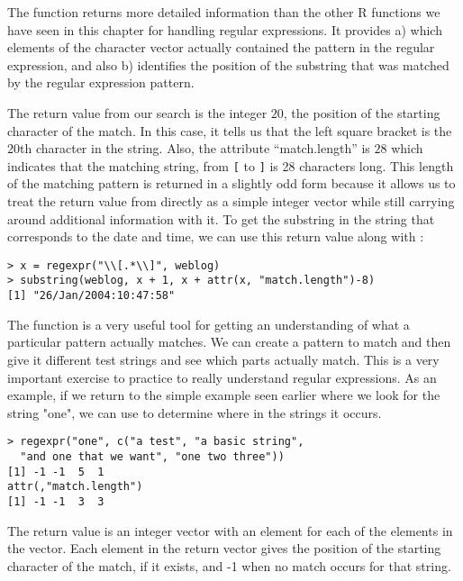The function  returns more detailed information
than the other R functions we have seen in this chapter for handling
regular expressions.  It provides a) which elements of the character
vector actually contained the pattern in the regular expression, and
also b) identifies the position of the substring that was matched by
the regular expression pattern.
 
The return value from our search is the integer $20$, the position of
the starting character of the match.  In this case, it tells us that
the left square bracket is the 20th character in the string. Also, the
attribute ``match.length'' is $28$ which indicates that the matching
string, from \verb+[+ to \verb+]+ is 28 characters long.  This length
of the matching pattern is returned in a slightly odd form because it
allows us to treat the return value from  directly
as a simple integer vector while still carrying around additional
information with it.  To get the substring in the string that
corresponds to the date and time, we can use this return value along
with : 
{\footnotesize{
\begin{verbatim}
> x = regexpr("\\[.*\\]", weblog)
> substring(weblog, x + 1, x + attr(x, "match.length")-8)
[1] "26/Jan/2004:10:47:58"
\end{verbatim}  
}}

The  function is a very useful tool for getting an
understanding of what a particular pattern actually matches.  We can
create a pattern to match and then give it different test strings and
see which parts actually match.  This is a very important exercise to
practice to really understand regular expressions.  As an example, if
we return to the simple example seen earlier where we look for the
string "one", we can use  to determine where in the
strings it occurs. 
 {\footnotesize{
\begin{verbatim}
> regexpr("one", c("a test", "a basic string", 
  "and one that we want", "one two three"))
[1] -1 -1  5  1
attr(,"match.length")
[1] -1 -1  3  3
\end{verbatim}
}}
\noindent 
The return value is an integer vector with an element for each of
the elements in the vector.  Each element in the return vector gives
the position of the starting character of the match, if it exists, and
-1 when no match occurs for that string.


